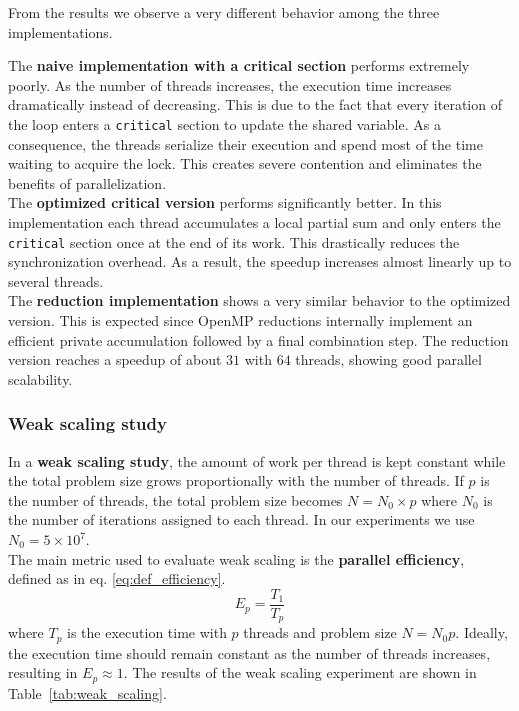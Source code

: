 \documentclass[unicode,10pt,a4paper,oneside,numbers=endperiod,openany]{scrartcl}
\begin{document}
From the results we observe a very different behavior among the three implementations.

The \textbf{naive implementation with a critical section} performs extremely poorly. As the number of threads increases, the execution time increases dramatically instead of decreasing. This is due to the fact that every iteration of the loop enters a \texttt{critical} section to update the shared variable. As a consequence, the threads serialize their execution and spend most of the time waiting to acquire the lock. This creates severe contention and eliminates the benefits of parallelization.\\

The \textbf{optimized critical version} performs significantly better. In this implementation each thread accumulates a local partial sum and only enters the \texttt{critical} section once at the end of its work. This drastically reduces the synchronization overhead. As a result, the speedup increases almost linearly up to several threads.\\

The \textbf{reduction implementation} shows a very similar behavior to the optimized version. This is expected since OpenMP reductions internally implement an efficient private accumulation followed by a final combination step. The reduction version reaches a speedup of about $31$ with $64$ threads, showing good parallel scalability.

\subsubsection{Weak scaling study}

In a \textbf{weak scaling study}, the amount of work per thread is kept constant while the total problem size grows proportionally with the number of threads. If $p$ is the number of threads, the total problem size becomes $ N = N_0 \times p $ where $N_0$ is the number of iterations assigned to each thread. In our experiments we use $ N_0 = 5 \times 10^7 $.\\
The main metric used to evaluate weak scaling is the \textbf{parallel efficiency}, defined as in eq. \ref{eq:def_efficiency}.
\begin{equation}
E_p = \frac{T_1}{T_p}
\label{eq:def_efficiency}
\end{equation}
where $T_p$ is the execution time with $p$ threads and problem size $N = N_0 p$. Ideally, the execution time should remain constant as the number of threads increases, resulting in $E_p \approx 1$. The results of the weak scaling experiment are shown in Table~\ref{tab:weak_scaling}.
\end{document}
